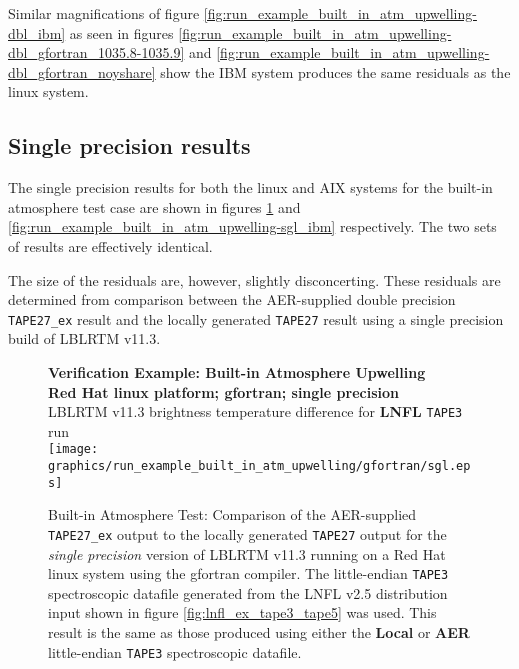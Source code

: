 Similar magnifications of figure \ref{fig:run_example_built_in_atm_upwelling-dbl_ibm} as seen in figures \ref{fig:run_example_built_in_atm_upwelling-dbl_gfortran_1035.8-1035.9} and \ref{fig:run_example_built_in_atm_upwelling-dbl_gfortran_noyshare} show the IBM system produces the same residuals as the linux system.


\subsection{Single precision results}
\label{sec:built_in_sgl}
The single precision results for both the linux and AIX systems for the built-in atmosphere test case are shown in figures \ref{fig:run_example_built_in_atm_upwelling-sgl_gfortran} and \ref{fig:run_example_built_in_atm_upwelling-sgl_ibm} respectively. The two sets of results are effectively identical.

The size of the residuals are, however, slightly disconcerting. These residuals are determined from comparison between the AER-supplied double precision \texttt{TAPE27\_ex} result and the locally generated \texttt{TAPE27} result using a single precision build of LBLRTM v11.3.

\begin{figure}[htp]
  \centering
  \qquad\sffamily\textbf{Verification Example: Built-in Atmosphere Upwelling}\\
  \qquad\sffamily\textbf{Red Hat linux platform; gfortran; single precision}\\
  \qquad\textsf{LBLRTM v11.3 brightness temperature difference for \textbf{LNFL} \texttt{TAPE3} run}\\
  \texttt{[image: graphics/run\_example\_built\_in\_atm\_upwelling/gfortran/sgl.eps]}
  \caption{Built-in Atmosphere Test: Comparison of the AER-supplied \texttt{TAPE27\_ex} output to the locally generated \texttt{TAPE27} output for the \textsl{single precision} version of LBLRTM v11.3 running on a Red Hat linux system using the gfortran compiler. The little-endian \texttt{TAPE3} spectroscopic datafile generated from the LNFL v2.5 distribution input shown in figure \ref{fig:lnfl_ex_tape3_tape5} was used. This result is the same as those produced using either the \textbf{Local} or \textbf{AER} little-endian \texttt{TAPE3} spectroscopic datafile.}
  \label{fig:run_example_built_in_atm_upwelling-sgl_gfortran}
\end{figure}

